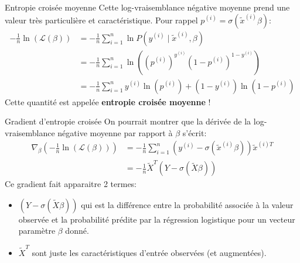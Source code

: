 \documentclass[10pt]{beamer}  %
\begin{document}
\begin{frame}{Entropie croisée moyenne}
	Cette log-vraisemblance négative moyenne prend une valeur très particulière et caractéristique. Pour rappel $p^{(i)} = \sigma(\tilde{x}^{(i)} \beta)$:
	\begin{equation}
		\begin{aligned}
			-\frac{1}{n} \ln{\left(\mathcal{L}(\beta)\right)} 
			&= - \frac{1}{n} \sum_{i=1}^n \ln{P(y^{(i)} \mid \tilde{x}^{(i)}, \beta)} \\
			&= - \frac{1}{n} \sum_{i=1}^n \ln{\left(\left(p^{(i)}\right)^{y^{(i)}} \left(1 - p^{(i)}\right)^{1 - y^{(i)}}\right)} \\
			&= - \frac{1}{n} \sum_{i=1}^n y^{(i)} \ln{\left(p^{(i)}\right)} + (1 - y^{(i)}) \ln{\left(1 - p^{(i)}\right)}
		\end{aligned}
		\nonumber
	\end{equation}
	Cette quantité est appelée \textbf{entropie croisée moyenne} !
\end{frame}

\begin{frame}{Gradient d'entropie croisée}
	On pourrait montrer que la dérivée de la log-vraisemblance négative moyenne par rapport à $\beta$ s'écrit:
	\begin{equation}
		\begin{aligned}
			\nabla_{\beta}\left(- \frac{1}{n} \ln{\left(\mathcal{L}(\beta)\right)}\right) 
			&= - \frac{1}{n} \sum_{i=1}^n \left(y^{(i)} - \sigma(\tilde{x}^{(i)} \beta)\right) \tilde{x}^{(i)T} \\
			&= - \frac{1}{n} \tilde{X}^T \left(Y - \sigma\left(\tilde{X} \beta\right)\right)
		\end{aligned}
		\nonumber
	\end{equation}
	Ce gradient fait apparaitre 2 termes:
	\begin{itemize}
		\item $\left(Y - \sigma\left(\tilde{X} \beta\right)\right)$ qui est la différence entre la probabilité associée à la valeur observée et la probabilité prédite par la régression logistique pour un vecteur paramètre $\beta$ donné.
		\item $\tilde{X}^T$ sont juste les caractéristiques d'entrée observées (et augmentées).
	\end{itemize}
\end{frame}
\end{document}
